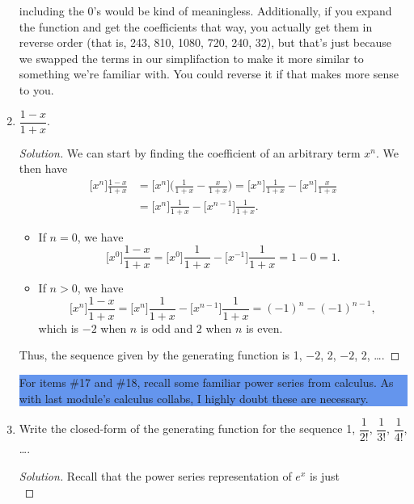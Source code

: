 \documentclass{article}
\renewcommand{\labelenumi}{\colorbox{pink}{\textbf{\arabic{enumi}}}}
\newenvironment{solution}
  {\renewcommand\qedsymbol{$\blacksquare$}\begin{proof}[Solution]}
  {\end{proof}}
\begin{document}
\begin{enumerate}
{\begin{minipage}[t]{.76\textwidth}
        including the 0's would be kind of meaningless. Additionally, if you expand the function and get the coefficients that way, you actually get them in reverse order (that is, 
        243, 810, 1080, 720, 240, 32), but that's just because we swapped the terms in our simplifaction to make it more similar to something we're familiar with. You could reverse it if that makes more sense to you.
    \end{minipage}%
    }
    \item $\dfrac{1-x}{1+x}$.\begin{solution}
        We can start by finding the coefficient of an arbitrary term $x^n$. We then have\begin{align*}
            \big[x^n\big] \frac{1-x}{1+x} &= \big[x^n\big] \bigg(\frac{1}{1+x} - \frac{x}{1+x} \bigg) = \big[x^n\big] \frac{1}{1+x} - \big[x^n\big] \frac{x}{1+x} \\ 
            &= \big[x^n\big] \frac{1}{1+x} - \big[x^{n-1}\big] \frac{1}{1+x}.
        \end{align*}\begin{itemize} 
            \item If $n=0$, we have\[
                \big[x^0\big] \frac{1-x}{1+x} = \big[x^0\big] \frac{1}{1+x} - \big[x^{-1}\big] \frac{1}{1+x} = 1- 0 = 1. 
            \]
            \item If $n>0$, we have\[
                \big[x^n\big] \frac{1-x}{1+x} = \big[x^n\big] \frac{1}{1+x} - \big[x^{n-1}\big] \frac{1}{1+x} = {(-1)}^n - {(-1)}^{n-1},
            \] which is $-2$ when $n$ is odd and $2$ when $n$ is even. 
        \end{itemize} Thus, the sequence given by the generating function is 1, $-2$, 2, $-2$, 2, \ldots. 
    \end{solution}
    \colorbox{CornflowerBlue}{
    \begin{minipage}[c]{0.9\textwidth}
        \centering
        For items \#17 and \#18, recall some familiar power series from calculus. As with last module's calculus collabs, I highly doubt these are necessary. 
    \end{minipage}
    }
    \renewcommand{\labelenumi}{\fcolorbox{magenta}{white}{\textbf{\arabic{enumi}}}}
    \item Write the closed-form of the generating function for the sequence 1, $\dfrac{1}{2!}$, $\dfrac{1}{3!}$, $\dfrac{1}{4!}$, \ldots.\begin{solution}
        Recall that the power series representation of $e^x$ is just\[
\]
\end{solution}
\end{enumerate}
\end{document}
